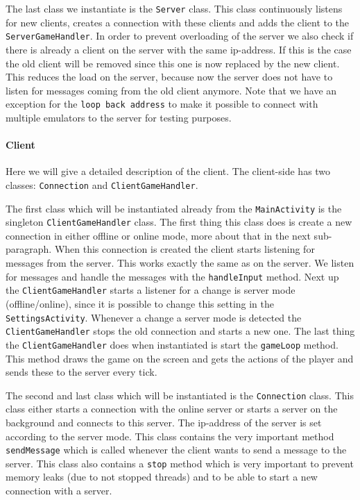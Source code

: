 \documentclass[../main.tex]{subfiles}
\begin{document}
        The last class we instantiate is the \texttt{Server} class. This class continuously listens for new clients, creates a connection with these clients and adds the client to the \texttt{ServerGameHandler}. In order to prevent overloading of the server we also check if there is already a client on the server with the same ip-address. If this is the case the old client will be removed since this one is now replaced by the new client. This reduces the load on the server, because now the server does not have to listen for messages coming from the old client anymore. Note that we have an exception for the \texttt{loop back address} to make it possible to connect with multiple emulators to the server for testing purposes.

        \paragraph{Client}
        Here we will give a detailed description of the client. The client-side has two classes: \texttt{Connection} and \texttt{ClientGameHandler}.

        The first class which will be instantiated already from the \texttt{MainActivity} is the singleton \texttt{ClientGameHandler} class. The first thing this class does is create a new connection in either offline or online mode, more about that in the next sub-paragraph. When this connection is created the client starts listening for messages from the server. This works exactly the same as on the server. We listen for messages and handle the messages with the \texttt{handleInput} method. Next up the \texttt{ClientGameHandler} starts a listener for a change is server mode (offline/online), since it is possible to change this setting in the \texttt{SettingsActivity}. Whenever a change a server mode is detected the \texttt{ClientGameHandler} stops the old connection and starts a new one. The last thing the \texttt{ClientGameHandler} does when instantiated is start the \texttt{gameLoop} method. This method draws the game on the screen and gets the actions of the player and sends these to the server every tick.

        The second and last class which will be instantiated is the \texttt{Connection} class. This class either starts a connection with the online server or starts a server on the background and connects to this server. The ip-address of the server is set according to the server mode. This class contains the very important method \texttt{sendMessage} which is called whenever the client wants to send a message to the server. This class also contains a \texttt{stop} method which is very important to prevent memory leaks (due to not stopped threads) and to be able to start a new connection with a server. 
\end{document}
